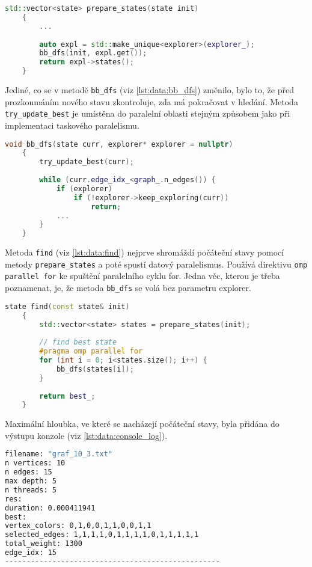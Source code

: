 \begin{lstlisting}[language=C++, label={lst:data:prepare_states}, caption={Metoda pro přípravu počátečních stavů}]
    std::vector<state> prepare_states(state init)
    {
        ...
    
        auto expl = std::make_unique<explorer>(explorer_);
        bb_dfs(init, expl.get());
        return expl->states();
    }
\end{lstlisting}

Jediné, co se v metodě \texttt{bb\_dfs} (viz \ref{lst:data:bb_dfs}) změnilo, bylo to, že před prozkoumáním nového stavu zkontroluje, zda má pokračovat v hledání.
Metoda \texttt{try\_update\_best} je umístěna do paralelní oblasti stejným způsobem jako při implementaci taskového paralelismu.

\begin{lstlisting}[language=C++, label={lst:data:bb_dfs}, caption={Metoda pro prohledávání stavového prostoru}]
    void bb_dfs(state curr, explorer* explorer = nullptr)
    {
        try_update_best(curr);
        
        while (curr.edge_idx_<graph_.n_edges()) {
            if (explorer)
                if (!explorer->keep_exploring(curr))
                    return;
            ...
        }
    }
\end{lstlisting}

Metoda \texttt{find} (viz \ref{lst:data:find}) nejprve shromáždí počáteční stavy pomocí metody \texttt{prepare\_states} a poté spustí datový paralelismus.
Používá direktivu \texttt{omp parallel for} ke spuštění paralelního cyklu for.
Jedna věc, kterou je třeba poznamenat, je, že metoda \texttt{bb\_dfs} se volá bez parametru explorer.

\begin{lstlisting}[language=C++, label={lst:data:find}, caption={Metoda pro nalezení nejlepšího stavu}]
    state find(const state& init)
    {
        std::vector<state> states = prepare_states(init);
    
        // find best state
        #pragma omp parallel for
        for (int i = 0; i<states.size(); i++) {
            bb_dfs(states[i]);
        }
    
        return best_;
    }
\end{lstlisting}

Maximální hloubka, ve které se nacházejí počáteční stavy, byla přidána do výstupu konzole (viz \ref{lst:data:console_log}).

\begin{lstlisting}[language=bash, label={lst:data:console_log}, caption={Příklad výpisu výsledků}]
filename: "graf_10_3.txt"
n vertices: 10
n edges: 15
max depth: 5
n threads: 5
res:
duration: 0.000411941
best:
vertex_colors: 0,1,0,0,1,1,0,0,1,1
selected_edges: 1,1,1,1,0,1,1,1,1,0,1,1,1,1,1
total_weight: 1300
edge_idx: 15
--------------------------------------------------
\end{lstlisting}









